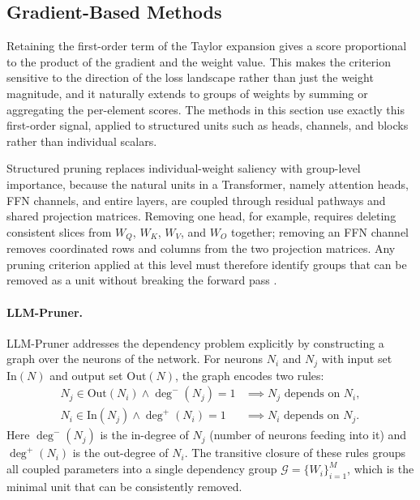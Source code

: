 \subsection{Gradient-Based Methods}

Retaining the first-order term of the Taylor expansion gives a score proportional to the product of the gradient and the weight value. This makes the criterion sensitive to the direction of the loss landscape rather than just the weight magnitude, and it naturally extends to groups of weights by summing or aggregating the per-element scores. The methods in this section use exactly this first-order signal, applied to structured units such as heads, channels, and blocks rather than individual scalars.

Structured pruning replaces individual-weight saliency with group-level importance, because the natural units in a Transformer, namely attention heads, FFN channels, and entire layers, are coupled through residual pathways and shared projection matrices. Removing one head, for example, requires deleting consistent slices from $W_Q$, $W_K$, $W_V$, and $W_O$ together; removing an FFN channel removes coordinated rows and columns from the two projection matrices. Any pruning criterion applied at this level must therefore identify groups that can be removed as a unit without breaking the forward pass \cite{michel2022not,kurtic2022optimal}.

\paragraph{LLM-Pruner.}
LLM-Pruner \cite{ma2023llmpruner} addresses the dependency problem explicitly by constructing a graph over the neurons of the network. For neurons $N_i$ and $N_j$ with input set $\mathrm{In}(N)$ and output set $\mathrm{Out}(N)$, the graph encodes two rules:
\begin{align}
	N_j \in \mathrm{Out}(N_i) \wedge \deg^{-}(N_j)=1 &\implies N_j \text{ depends on } N_i, \label{eq:dep1}\\
	N_i \in \mathrm{In}(N_j) \wedge \deg^{+}(N_i)=1 &\implies N_i \text{ depends on } N_j. \label{eq:dep2}
\end{align}
Here $\deg^{-}(N_j)$ is the in-degree of $N_j$ (number of neurons feeding into it) and $\deg^{+}(N_i)$ is the out-degree of $N_i$. The transitive closure of these rules groups all coupled parameters into a single dependency group $\mathcal{G} = \{W_i\}_{i=1}^M$, which is the minimal unit that can be consistently removed.


